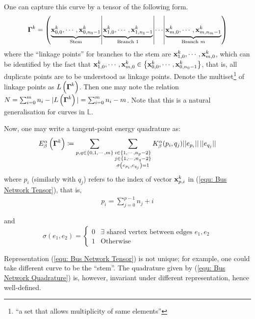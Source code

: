 \documentclass[../dissertation.tex]{subfiles}
\begin{document}
One can capture this curve by a tensor of the following form.
\begin{equation}
    \boldsymbol{\Gamma}^k = \left( \underbrace{\mathbf{x}_{0,0}^k, \cdots, \mathbf{x}_{0,n_0-1}^k}_{\text{Stem}} \middle|
    \underbrace{\mathbf{x}_{1,0}^k, \cdots, \mathbf{x}_{1,n_1-1}^k}_{\text{Branch 1}}
\middle| \cdots \middle|
\underbrace{\mathbf{x}_{m,0}^k, \cdots, \mathbf{x}_{m,n_m-1}^k}_{\text{Branch } m}\right)
\label{equ: Bus Network Tensor}
\end{equation}
where the ``linkage points'' for branches to the stem are $\mathbf{x}_{1,0}^k, \cdots, \mathbf{x}_{m,0}^k$,
which can be identified by the fact that $\mathbf{x}_{1,0}^k, \cdots, \mathbf{x}_{m,0}^k \in \left\{ \mathbf{x}_{0,0}^k, \cdots, \mathbf{x}_{0, n_0-1}^k \right\}$,
that is, all duplicate points are to be understood as linkage points.
Denote the multiset\footnote{``a set that allows multiplicity of same elements''} of linkage points as $L \left( \boldsymbol{\Gamma}^k \right)$.
Then one may note the relation $N = \sum_{i=0}^{m} n_{i} - |L\left( \boldsymbol{\Gamma}^k \right)| = \sum_{i=0}^m n_i - m$.
Note that this is a natural generalisation for curves in $\mathbb{L}$.

Now, one may write a tangent-point energy quadrature as:
\begin{equation}
    E_{\beta}^{\alpha} \left( \boldsymbol{\Gamma}^k \right) \coloneqq 
    \sum_{p, q \in \left\{ 0, 1, \cdots, m \right\}}
    \sum_{\substack{
            i \in \left\{ 1, \cdots, n_p - 2 \right\} \\
            j \in \left\{ 1, \cdots, n_q - 2 \right\} \\
            \sigma \left( e_{p_i}, e_{q_j} \right) = 1
    }}
    K_{\beta}^{\alpha} (p_i,q_j) \lvert \lvert e_{p_i} \rvert \rvert \, \lvert \lvert e_{q_j} \rvert \rvert
    \label{equ: Bus Network Quadrature}
\end{equation}
where $p_i$ (similarly with $q_j$) refers to the index of vector $\mathbf{x}_{p,i}^k$ in (\ref{equ: Bus Network Tensor}),
that is,
\begin{align*}
    p_i = \sum_{j=0}^{p-1} n_j + i
\end{align*}

and
\begin{equation*}
    \sigma \left( e_1, e_2 \right) =
    \begin{cases}
        0 & \exists \text{ shared vertex between edges } e_1, e_2 \\
        1 & \text{Otherwise}
    \end{cases}
\end{equation*}

\begin{remark}
    Representation (\ref{equ: Bus Network Tensor}) is not unique; for example, one could take different curve to be the ``stem''.
    The quadrature given by (\ref{equ: Bus Network Quadrature}) is, however, invariant under different representation, hence well-defined.
\end{remark}
\end{document}
